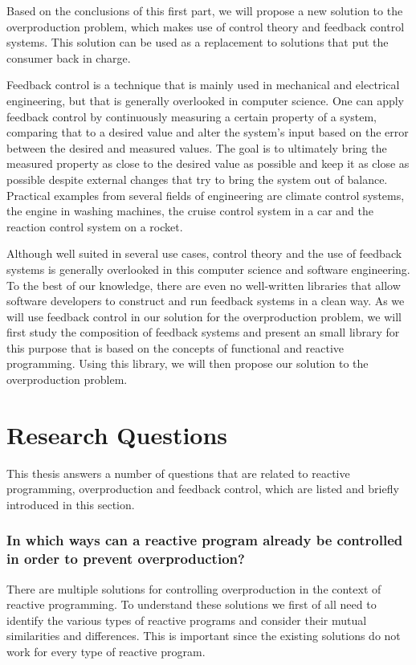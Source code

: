 Based on the conclusions of this first part, we will propose a new solution to the overproduction problem, which makes use of control theory and feedback control systems. This solution can be used as a replacement to solutions that put the consumer back in charge.

Feedback control is a technique that is mainly used in mechanical and electrical engineering, but that is generally overlooked in computer science. One can apply feedback control by continuously measuring a certain property of a system, comparing that to a desired value and alter the system's input based on the error between the desired and measured values. The goal is to ultimately bring the measured property as close to the desired value as possible and keep it as close as possible despite external changes that try to bring the system out of balance.  Practical examples from several fields of engineering are climate control systems, the engine in washing machines, the cruise control system in a car and the reaction control system on a rocket.

Although well suited in several use cases, control theory and the use of feedback systems is generally overlooked in this computer science and software engineering. To the best of our knowledge, there are even no well-written libraries that allow software developers to construct and run feedback systems in a clean way. As we will use feedback control in our solution for the overproduction problem, we will first study the composition of feedback systems and present an small library for this purpose that is based on the concepts of functional and reactive programming. Using this library, we will then propose our solution to the overproduction problem.

\section*{Research Questions}
This thesis answers a number of questions that are related to reactive programming, overproduction and feedback control, which are listed and briefly introduced in this section.

\subsubsection*{In which ways can a reactive program already be controlled in order to prevent overproduction?}
There are multiple solutions for controlling overproduction in the context of reactive programming. To understand these solutions we first of all need to identify the various types of reactive programs and consider their mutual similarities and differences. This is important since the existing solutions do not work for every type of reactive program.

